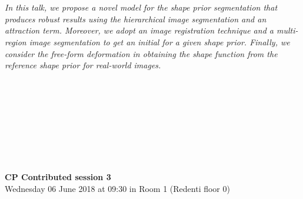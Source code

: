 \begin{multicols}{2}
      \\
      \\\\
      \\
      \\\\
\\
    \textit{In this talk, we propose a novel model for the shape prior segmentation that produces robust results using the hierarchical image segmentation and an attraction term. Moreover, we adopt an image registration technique and a multi-region image segmentation to get an initial for a given shape prior. Finally, we consider the free-form deformation in obtaining the shape function from the reference shape prior for real-world images.}\\
\\ 
      \\
      \\\\
      \\
      \\\\
\\
  \end{multicols}
  \noindent\textbf{CP Contributed session 3}\\
    Wednesday 06 June 2018 at 09:30 in Room 1 (Redenti floor 0)  \\
  \textit{} \\
    

